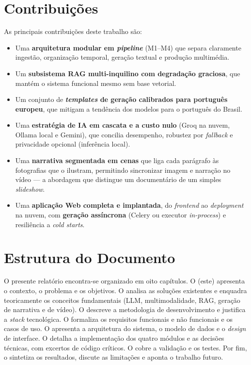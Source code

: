 \section{Contribuições}
\label{sec:contribuicoes}

As principais contribuições deste trabalho são:

\begin{itemize}[leftmargin=*]
  \item Uma \textbf{arquitetura modular em \emph{pipeline}} (M1--M4) que
  separa claramente ingestão, organização temporal, geração textual e
  produção multimédia.
  \item Um \textbf{subsistema RAG multi-inquilino com degradação
  graciosa}, que mantém o sistema funcional mesmo sem base vetorial.
  \item Um conjunto de \textbf{\emph{templates} de geração calibrados para
  português europeu}, que mitigam a tendência dos modelos para o
  português do Brasil.
  \item Uma \textbf{estratégia de IA em cascata e a custo nulo} (Groq na
  nuvem, Ollama local e Gemini), que concilia desempenho, robustez por
  \emph{fallback} e privacidade opcional (inferência local).
  \item Uma \textbf{narrativa segmentada em cenas} que liga cada parágrafo
  às fotografias que o ilustram, permitindo sincronizar imagem e narração
  no vídeo — a abordagem que distingue um documentário de um simples
  \emph{slideshow}.
  \item Uma \textbf{aplicação Web completa e implantada}, do
  \emph{frontend} ao \emph{deployment} na nuvem, com \textbf{geração
  assíncrona} (Celery ou executor \emph{in-process}) e resiliência a
  \emph{cold starts}.
\end{itemize}

\section{Estrutura do Documento}
\label{sec:estrutura}

O presente relatório encontra-se organizado em oito capítulos. O
\textbf{} (este) apresenta o contexto, o problema e
os objetivos. O \textbf{} analisa as soluções
existentes e enquadra teoricamente os conceitos fundamentais (LLM,
multimodalidade, RAG, geração de narrativa e de vídeo). O
\textbf{} descreve a metodologia de desenvolvimento
e justifica a \emph{stack} tecnológica. O \textbf{}
formaliza os requisitos funcionais e não funcionais e os casos de uso. O
\textbf{} apresenta a arquitetura do sistema, o
modelo de dados e o \emph{design} de interface. O
\textbf{} detalha a implementação dos quatro
módulos e as decisões técnicas, com excertos de código críticos. O
\textbf{} cobre a validação e os testes. Por fim, o
\textbf{} sintetiza os resultados, discute as
limitações e aponta o trabalho futuro.
